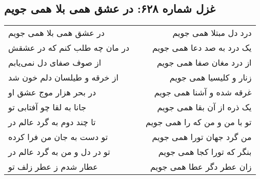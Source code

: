 \begin{center}
\section*{غزل شماره ۶۲۸: در عشق همی بلا همی جویم}
\label{sec:628}
\begin{longtable}{l p{0.5cm} r}
در عشق همی بلا همی جویم
&&
درد دل مبتلا همی جویم
\\
در مان چه طلب کنم که در عشقش
&&
یک درد به صد دعا همی جویم
\\
از صوف صفای دل نمی‌یابم
&&
از درد مغان صفا همی جویم
\\
از خرقه و طیلسان دلم خون شد
&&
زنار و کلیسیا همی جویم
\\
در بحر هزار موج عشق او
&&
غرقه شده و آشنا همی جویم
\\
جانا به لقا چو آفتابی تو
&&
یک ذره از آن بقا همی جویم
\\
تا چند دوم به گرد عالم در
&&
تو با من و من که را همی جویم
\\
تو دست به جان من فرا کرده
&&
من گرد جهان تورا همی جویم
\\
تو در دل و من به گرد عالم در
&&
بنگر که تورا کجا همی جویم
\\
عطار شدم ز عطر زلف تو
&&
زان عطر دگر عطا همی جویم
\\
\end{longtable}
\end{center}
